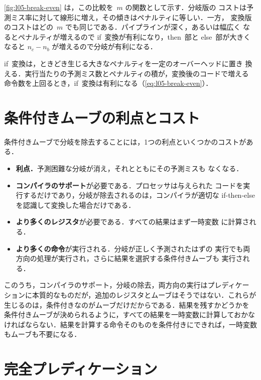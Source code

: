 \documentclass[../main.tex]{subfiles}
\begin{document}
\cref{fig:l05-break-even} は，この比較を~$m$ の関数として示す．分岐版の
コストは予測ミス率に対して線形に増え，その傾きはペナルティに等しい．一方，
変換版のコストはどの~$m$ でも同じである．パイプラインが深く，あるいは幅広く
なるとペナルティが増えるので if~変換が有利になり，then~部と else~部が大きく
なると $n_c - n_b$ が増えるので分岐が有利になる．

\begin{keypoint}
  if~変換は，ときどき生じる大きなペナルティを一定のオーバーヘッドに置き
  換える．実行当たりの予測ミス数とペナルティの積が，変換後のコードで増える
  命令数を上回るとき，if~変換は有利になる（\cref{eq:l05-break-even}）．
\end{keypoint}

\section{条件付きムーブの利点とコスト}
\label{sec:l05-cmov-summary}

条件付きムーブで分岐を除去することには，1つの利点といくつかのコストがある．
\begin{itemize}
  \item \textbf{利点．}予測困難な分岐が消え，それとともにその予測ミスも
    なくなる．
  \item \textbf{コンパイラのサポート}が必要である．プロセッサは与えられた
    コードを実行するだけであり，分岐が除去されるのは，コンパイラが適切な
    if-then-else を認識して変換した場合だけである．
  \item \textbf{より多くのレジスタ}が必要である．すべての結果はまず一時変数
    に計算される．
  \item \textbf{より多くの命令}が実行される．分岐が正しく予測されたはずの
    実行でも両方向の処理が実行され，さらに結果を選択する条件付きムーブも
    実行される．
\end{itemize}

このうち，コンパイラのサポート，分岐の除去，両方向の実行はプレディケー
ションに本質的なものだが，追加のレジスタとムーブはそうではない．これらが
生じるのは，条件付きなのがムーブだけだからである．結果を残すかどうかを
条件付きムーブが決められるように，すべての結果を一時変数に計算しておかな
ければならない．結果を計算する命令そのものを条件付きにできれば，一時変数
もムーブも不要になる．

\section{完全プレディケーション}
\label{sec:l05-full}
\end{document}
